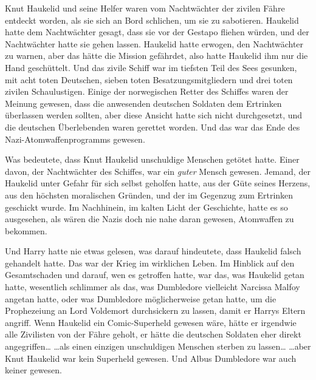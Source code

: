 Knut Haukelid und seine Helfer waren vom Nachtwächter der zivilen Fähre entdeckt worden, als sie sich an Bord schlichen, um sie zu sabotieren. Haukelid hatte dem Nachtwächter gesagt, dass sie vor der Gestapo fliehen würden, und der Nachtwächter hatte sie gehen lassen. Haukelid hatte erwogen, den Nachtwächter zu warnen, aber das hätte die Mission gefährdet, also hatte Haukelid ihm nur die Hand geschüttelt. Und das zivile Schiff war im tiefsten Teil des Sees gesunken, mit acht toten Deutschen, sieben toten Besatzungsmitgliedern und drei toten zivilen Schaulustigen. Einige der norwegischen Retter des Schiffes waren der Meinung gewesen, dass die anwesenden deutschen Soldaten dem Ertrinken überlassen werden sollten, aber diese Ansicht hatte sich nicht durchgesetzt, und die deutschen Überlebenden waren gerettet worden. Und das war das Ende des Nazi-Atomwaffenprogramms gewesen.

Was bedeutete, dass Knut Haukelid unschuldige Menschen getötet hatte. Einer davon, der Nachtwächter des Schiffes, war ein \emph{guter} Mensch gewesen. Jemand, der Haukelid unter Gefahr für sich selbst geholfen hatte, aus der Güte seines Herzens, aus den höchsten moralischen Gründen, und der im Gegenzug zum Ertrinken geschickt wurde.
Im Nachhinein, im kalten Licht der Geschichte, hatte es so ausgesehen, als wären die Nazis doch nie nahe daran gewesen, Atomwaffen zu bekommen.

Und Harry hatte nie etwas gelesen, was darauf hindeutete, dass Haukelid falsch gehandelt hatte.
Das war der Krieg im wirklichen Leben. Im Hinblick auf den Gesamtschaden und darauf, wen es getroffen hatte, war das, was Haukelid getan hatte, wesentlich schlimmer als das, was Dumbledore vielleicht Narcissa Malfoy angetan hatte, oder was Dumbledore möglicherweise getan hatte, um die Prophezeiung an Lord Voldemort durchsickern zu lassen, damit er Harrys Eltern angriff.
Wenn Haukelid ein Comic-Superheld gewesen wäre, hätte er irgendwie alle Zivilisten von der Fähre geholt, er hätte die deutschen Soldaten eher direkt angegriffen…
…als einen einzigen unschuldigen Menschen sterben zu lassen…
…aber Knut Haukelid war kein Superheld gewesen.
Und Albus Dumbledore war auch keiner gewesen.


